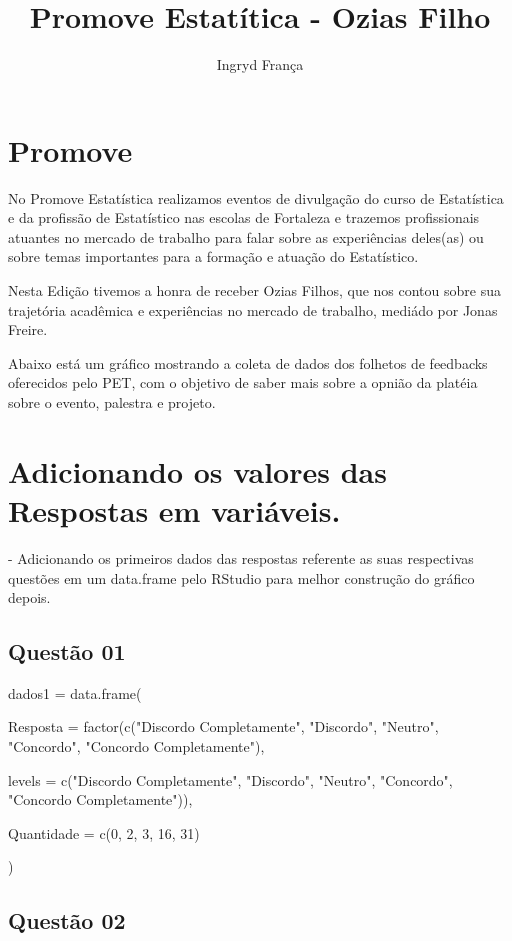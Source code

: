 \documentclass{article}
\title{Promove Estatítica - Ozias Filho}
\author{Ingryd França}
\begin{document}
\maketitle

\section{Promove}

    No Promove Estatística realizamos eventos de divulgação do curso de Estatística e da profissão de Estatístico nas escolas de Fortaleza e trazemos profissionais atuantes no mercado de trabalho para falar sobre as experiências deles(as) ou sobre temas importantes para a formação e atuação do Estatístico.

    Nesta Edição tivemos a honra de receber Ozias Filhos, que nos contou sobre sua trajetória acadêmica e experiências no mercado de trabalho, mediádo por Jonas Freire.

    Abaixo está um gráfico mostrando a coleta de dados dos folhetos de feedbacks oferecidos pelo PET, com o objetivo de saber mais sobre a opnião da platéia sobre o evento, palestra e projeto.

\section{Adicionando os valores das Respostas em variáveis.}

- Adicionando os primeiros dados das respostas referente as suas respectivas questões em um data.frame pelo RStudio para melhor construção do gráfico depois.

\subsection{Questão 01}

dados1 = data.frame(

  Resposta = factor(c("Discordo Completamente", "Discordo", "Neutro", "Concordo", "Concordo Completamente"),
  
                    levels = c("Discordo Completamente", "Discordo", "Neutro", "Concordo", 
                               "Concordo Completamente")),
                               
  Quantidade = c(0, 2, 3, 16, 31)
  
)

\subsection{Questão 02}
\end{document}
